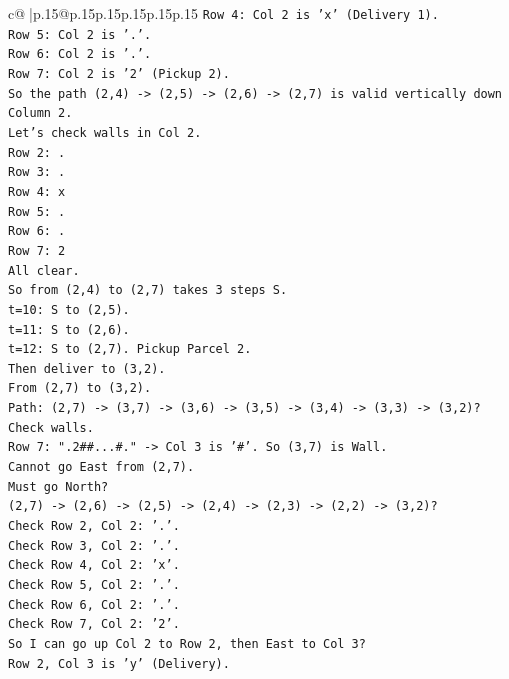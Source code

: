 \documentclass{article}
\begin{document}
{\begin{supertabular}{c@{$\;$}|p{.15\linewidth}@{}p{.15\linewidth}p{.15\linewidth}p{.15\linewidth}p{.15\linewidth}p{.15\linewidth}}
{{{\texttt{Row 4: Col 2 is 'x' (Delivery 1).} \\
\texttt{Row 5: Col 2 is '.'.} \\
\texttt{Row 6: Col 2 is '.'.} \\
\texttt{Row 7: Col 2 is '2' (Pickup 2).} \\
\texttt{So the path (2,4) {-}> (2,5) {-}> (2,6) {-}> (2,7) is valid vertically down Column 2.} \\
\texttt{Let's check walls in Col 2.} \\
\texttt{Row 2: .} \\
\texttt{Row 3: .} \\
\texttt{Row 4: x} \\
\texttt{Row 5: .} \\
\texttt{Row 6: .} \\
\texttt{Row 7: 2} \\
\texttt{All clear.} \\
\texttt{So from (2,4) to (2,7) takes 3 steps S.} \\
\texttt{t=10: S to (2,5).} \\
\texttt{t=11: S to (2,6).} \\
\texttt{t=12: S to (2,7). Pickup Parcel 2.} \\
\texttt{Then deliver to (3,2).} \\
\texttt{From (2,7) to (3,2).} \\
\texttt{Path: (2,7) {-}> (3,7) {-}> (3,6) {-}> (3,5) {-}> (3,4) {-}> (3,3) {-}> (3,2)?} \\
\texttt{Check walls.} \\
\texttt{Row 7: ".2\#\#...\#." {-}> Col 3 is '\#'. So (3,7) is Wall.} \\
\texttt{Cannot go East from (2,7).} \\
\texttt{Must go North?} \\
\texttt{(2,7) {-}> (2,6) {-}> (2,5) {-}> (2,4) {-}> (2,3) {-}> (2,2) {-}> (3,2)?} \\
\texttt{Check Row 2, Col 2: '.'.} \\
\texttt{Check Row 3, Col 2: '.'.} \\
\texttt{Check Row 4, Col 2: 'x'.} \\
\texttt{Check Row 5, Col 2: '.'.} \\
\texttt{Check Row 6, Col 2: '.'.} \\
\texttt{Check Row 7, Col 2: '2'.} \\
\texttt{So I can go up Col 2 to Row 2, then East to Col 3?} \\
\texttt{Row 2, Col 3 is 'y' (Delivery).} \\
}}}
\end{supertabular}}
\end{document}
